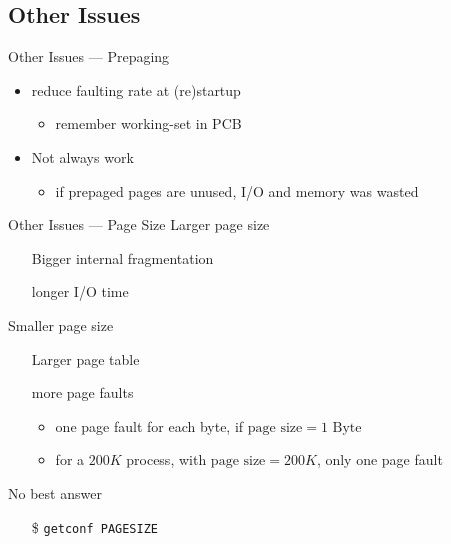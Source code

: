 \subsection{Other Issues}

\begin{frame}{Other Issues --- Prepaging}
  \begin{center}
  \end{center}
  \begin{itemize}
  \item reduce faulting rate at (re)startup
    \begin{itemize}
    \item remember working-set in PCB
    \end{itemize}
  \item Not always work
    \begin{itemize}
    \item if prepaged pages are unused, I/O and memory was wasted
    \end{itemize}
  \end{itemize}
\end{frame}

\begin{frame}{Other Issues --- Page Size}%
  Larger page size
  \begin{itemize}
  \item[\alert{\bad}] Bigger internal fragmentation
  \item[\alert{\bad}] longer I/O time
  \end{itemize}
  Smaller page size
  \begin{itemize}
  \item[\alert{\bad}] Larger page table
  \item[\alert{\bad}] more page faults
    \begin{itemize}
    \item one page fault for each byte, if $\text{page size} = 1 \text{ Byte}$
    \item for a $200K$ process, with $\text{page size} = 200K$, only one page fault
    \end{itemize}
  \end{itemize}
  No best answer
  \begin{itemize}
    \item[\$] \texttt{getconf PAGESIZE}
  \end{itemize}
\end{frame}

